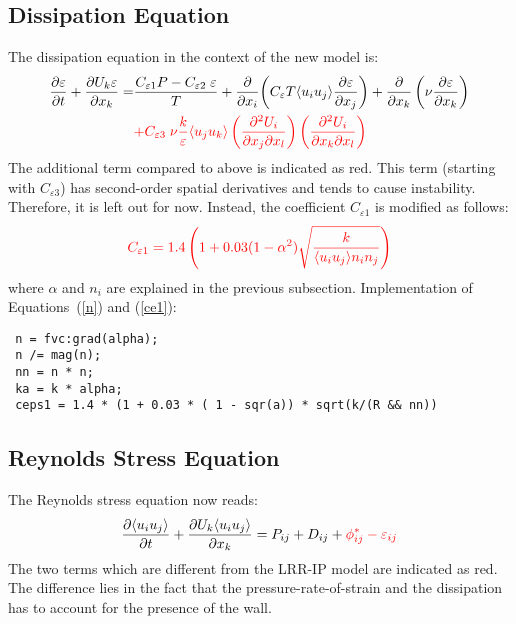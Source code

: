 \documentclass[11pt]{article}
\begin{document}
\subsection{Dissipation Equation}
The dissipation equation in the context of the new model is:
\begin{align*}
\frac{\partial \varepsilon}{\partial t} + \frac{\partial U_{k} \varepsilon }{\partial x_{k}} = & \frac{C_{\varepsilon 1}P - C_{\varepsilon 2} \;\varepsilon }{T} + \frac{\partial}{\partial x_{i}}{ \left( C_{\varepsilon} T \langle u_{i} u_{j} \rangle \frac{\partial \varepsilon} {\partial x_{j}} \right)  + \frac{\partial}{\partial x_{k}}} \left( \nu \frac{\partial \varepsilon}{\partial{x_{k}}} \right)   \\
& {\color{red} + C_{\varepsilon 3} \; \nu \frac{k}{\varepsilon} \langle u_{j} u_{k} \rangle \left( \frac{\partial^{2} U_{i}}{\partial x_{j} \partial x_{l}} \right) \left(\frac{\partial^{2} U_{i}}{\partial x_{k} \partial x_{l}} \right) }
\end{align*}
The additional term compared to above is indicated as red.
This term (starting with $C_{\varepsilon 3}$) has second-order spatial derivatives and tends to cause instability.  Therefore, it is left out for now. Instead, the coefficient $C_{\varepsilon 1}$ is modified as follows:
\begin{equation}
\color{red}
C_{\varepsilon 1} = 1.4 \left( 1 + 0.03 (1-\alpha^{2}) \sqrt{\frac{k}{\langle u_{i} u_{j} \rangle n_{i} n_{j}}} \right) \label{ce1}
\end{equation}
where $\alpha$ and $n_{i}$ are explained in the previous subsection.
Implementation of Equations~(\ref{n}) and (\ref{ce1}):
\begin{center}
\verb# n = fvc:grad(alpha);#  \\
\verb# n /= mag(n);# \\
\verb# nn = n * n;# \\
\verb# ka = k * alpha;# \\
\verb# ceps1 = 1.4 * (1 + 0.03 * ( 1 - sqr(a)) * sqrt(k/(R && nn))# \\
\end{center}

\subsection{Reynolds Stress Equation}
The Reynolds stress equation now reads:
\begin{equation}
\frac{\partial \langle u_{i} u_{j} \rangle}{\partial t} + \frac{\partial U_{k} \langle u_{i} u_{j} \rangle}{\partial x_{k}} = P_{ij} + D_{ij} + {\color{red}\phi_{ij}^{*} - \varepsilon_{ij}} \\
\end{equation}
The two terms which are different from the LRR-IP model are indicated as red. The difference lies in the fact that the pressure-rate-of-strain and the dissipation has to account for the presence of the wall.
\end{document}
